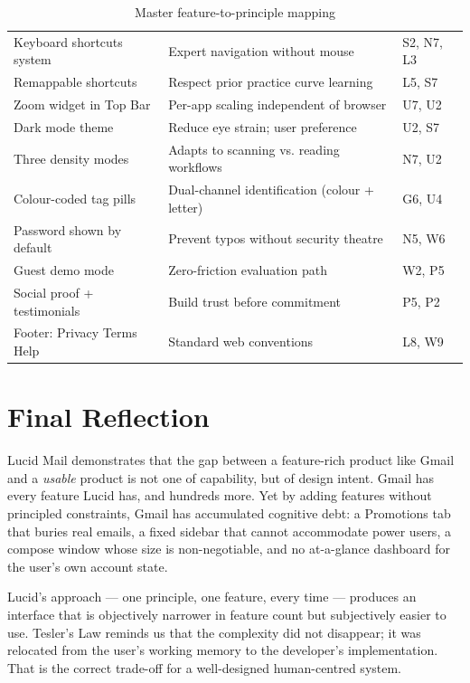 \documentclass[12pt,a4paper]{report}
\begin{document}
{{\begin{table}[H]
\begin{tabularx}{\textwidth}{lXl}
  Keyboard shortcuts system    & Expert navigation without mouse                     & S2, N7, L3\\
  Remappable shortcuts         & Respect prior practice curve learning               & L5, S7\\
  Zoom widget in Top Bar       & Per-app scaling independent of browser              & U7, U2\\
  Dark mode theme              & Reduce eye strain; user preference                  & U2, S7\\
  Three density modes          & Adapts to scanning vs. reading workflows            & N7, U2\\
  Colour-coded tag pills       & Dual-channel identification (colour + letter)       & G6, U4\\
  Password shown by default    & Prevent typos without security theatre               & N5, W6\\
  Guest demo mode              & Zero-friction evaluation path                       & W2, P5\\
  Social proof + testimonials  & Build trust before commitment                       & P5, P2\\
  Footer: Privacy Terms Help   & Standard web conventions                            & L8, W9\\
  \bottomrule
\end{tabularx}
\caption{Master feature-to-principle mapping}
\end{table}

\section{Final Reflection}

Lucid Mail demonstrates that the gap between a feature-rich product like Gmail and a
\textit{usable} product is not one of capability, but of design intent. Gmail has every
feature Lucid has, and hundreds more. Yet by adding features without principled constraints,
Gmail has accumulated cognitive debt: a Promotions tab that buries real emails, a fixed
sidebar that cannot accommodate power users, a compose window whose size is non-negotiable,
and no at-a-glance dashboard for the user's own account state.

Lucid's approach — one principle, one feature, every time — produces an interface that
is objectively narrower in feature count but subjectively easier to use. Tesler's Law
reminds us that the complexity did not disappear; it was relocated from the user's working
memory to the developer's implementation. That is the correct trade-off for a well-designed
human-centred system.

}}
\end{document}
